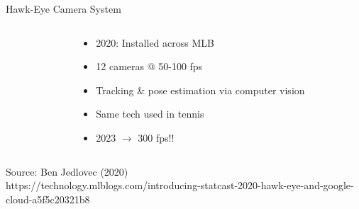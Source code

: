 \documentclass[handout]{beamer}
\begin{document}
\begin{frame}{Hawk-Eye Camera System}
\begin{columns}
\begin{column}{0.6\textwidth}
    \end{column}
    \pause
    \begin{column}{0.4\textwidth}
      \scriptsize
      \begin{itemize}
        \item 2020: Installed across MLB
        \item 12 cameras @ 50-100 fps
        \item Tracking \& pose estimation via computer vision
        \item Same tech used in tennis
        \pause
        \item 2023 $\rightarrow$ 300 fps!!
      \end{itemize}
    \end{column}
  \end{columns}
  \vfill
  \hfill\color{ricegray} \tiny Source: Ben Jedlovec (2020)\\
  \hfill https://technology.mlblogs.com/introducing-statcast-2020-hawk-eye-and-google-cloud-a5f5c20321b8
\end{frame}
\end{document}
